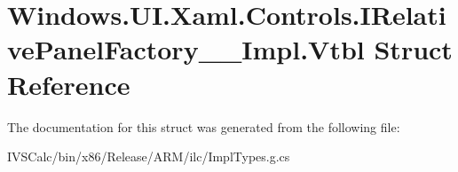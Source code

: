 \hypertarget{struct_windows_1_1_u_i_1_1_xaml_1_1_controls_1_1_i_relative_panel_factory_____impl_1_1_vtbl}{}\section{Windows.\+U\+I.\+Xaml.\+Controls.\+I\+Relative\+Panel\+Factory\+\_\+\+\_\+\+Impl.\+Vtbl Struct Reference}
\label{struct_windows_1_1_u_i_1_1_xaml_1_1_controls_1_1_i_relative_panel_factory_____impl_1_1_vtbl}


The documentation for this struct was generated from the following file\+:\begin{DoxyCompactItemize}
\item 
I\+V\+S\+Calc/bin/x86/\+Release/\+A\+R\+M/ilc/Impl\+Types.\+g.\+cs\end{DoxyCompactItemize}
